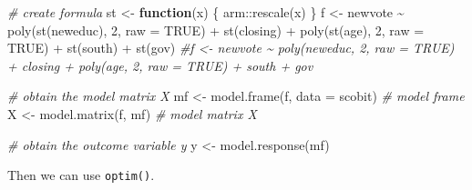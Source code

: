 \documentclass[
]{book}
\newenvironment{Shaded}{\begin{snugshade}}{\end{snugshade}}
\newcommand{\AttributeTok}[1]{\textcolor[rgb]{0.77,0.63,0.00}{#1}}
\newcommand{\CommentTok}[1]{\textcolor[rgb]{0.56,0.35,0.01}{\textit{#1}}}
\newcommand{\ConstantTok}[1]{\textcolor[rgb]{0.00,0.00,0.00}{#1}}
\newcommand{\ControlFlowTok}[1]{\textcolor[rgb]{0.13,0.29,0.53}{\textbf{#1}}}
\newcommand{\DecValTok}[1]{\textcolor[rgb]{0.00,0.00,0.81}{#1}}
\newcommand{\FunctionTok}[1]{\textcolor[rgb]{0.00,0.00,0.00}{#1}}
\newcommand{\NormalTok}[1]{#1}
\newcommand{\OtherTok}[1]{\textcolor[rgb]{0.56,0.35,0.01}{#1}}
\newcommand{\SpecialCharTok}[1]{\textcolor[rgb]{0.00,0.00,0.00}{#1}}
\newcommand{\StringTok}[1]{\textcolor[rgb]{0.31,0.60,0.02}{#1}}
\begin{document}
\begin{Shaded}
\begin{Highlighting}[]
\CommentTok{\# create formula}
\NormalTok{st }\OtherTok{\textless{}{-}} \ControlFlowTok{function}\NormalTok{(x) \{ arm}\SpecialCharTok{::}\FunctionTok{rescale}\NormalTok{(x) \}}
\NormalTok{f }\OtherTok{\textless{}{-}}\NormalTok{ newvote }\SpecialCharTok{\textasciitilde{}} \FunctionTok{poly}\NormalTok{(}\FunctionTok{st}\NormalTok{(neweduc), }\DecValTok{2}\NormalTok{, }\AttributeTok{raw =} \ConstantTok{TRUE}\NormalTok{) }\SpecialCharTok{+} \FunctionTok{st}\NormalTok{(closing) }\SpecialCharTok{+} \FunctionTok{poly}\NormalTok{(}\FunctionTok{st}\NormalTok{(age), }\DecValTok{2}\NormalTok{, }\AttributeTok{raw =} \ConstantTok{TRUE}\NormalTok{) }\SpecialCharTok{+} \FunctionTok{st}\NormalTok{(south) }\SpecialCharTok{+} \FunctionTok{st}\NormalTok{(gov)}
\CommentTok{\#f \textless{}{-} newvote \textasciitilde{} poly(neweduc, 2, raw = TRUE) + closing + poly(age, 2, raw = TRUE) + south + gov}


\CommentTok{\# obtain the model matrix X}
\NormalTok{mf }\OtherTok{\textless{}{-}} \FunctionTok{model.frame}\NormalTok{(f, }\AttributeTok{data =}\NormalTok{ scobit)  }\CommentTok{\# model frame}
\NormalTok{X }\OtherTok{\textless{}{-}} \FunctionTok{model.matrix}\NormalTok{(f, mf)         }\CommentTok{\# model matrix X}

\CommentTok{\# obtain the outcome variable y}
\NormalTok{y }\OtherTok{\textless{}{-}} \FunctionTok{model.response}\NormalTok{(mf)}
\end{Highlighting}
\end{Shaded}

Then we can use \texttt{optim()}.

\begin{Shaded}
\end{Shaded}
\end{document}
